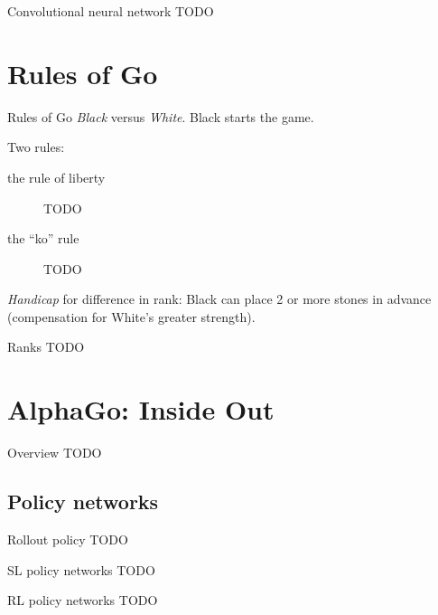 \documentclass{beamer}
\newcommand{\todo}{\alert{TODO}}
\begin{document}
  \begin{frame}{Convolutional neural network}
    \todo
  \end{frame}


  \section{Rules of Go}
  \begin{frame}{Rules of Go}
    \emph{Black} versus \emph{White}.
    Black starts the game.

    \pause
    Two rules:
    \begin{description}
      \item [the rule of liberty] \todo
      \item [the ``ko'' rule] \todo
    \end{description}

    \pause
    \emph{Handicap} for difference in rank:
    Black can place 2 or more stones in advance (compensation for White's greater strength).
  \end{frame}

  \begin{frame}{Ranks}
    \todo
  \end{frame}


  \section{AlphaGo: Inside Out}
  \begin{frame}{Overview}
    \todo
  \end{frame}

  \subsection{Policy networks}
  \begin{frame}{Rollout policy}
    \todo
  \end{frame}

  \begin{frame}{SL policy networks}
    \todo
  \end{frame}

  \begin{frame}{RL policy networks}
    \todo
  \end{frame}
\end{document}
